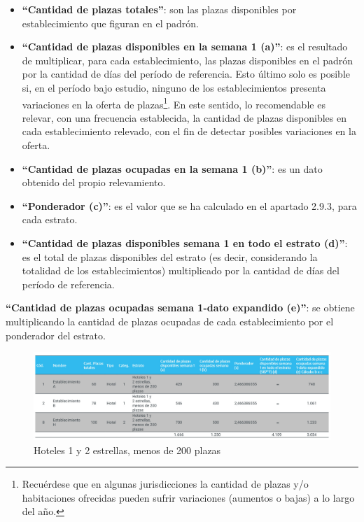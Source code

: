 \documentclass[
]{book}
\begin{document}
\begin{itemize}
\item
  \textbf{``Cantidad de plazas totales''}: son las plazas disponibles por establecimiento que figuran en el padrón.
\item
  \textbf{``Cantidad de plazas disponibles en la semana 1 (a)''}: es el resultado de multiplicar, para cada establecimiento, las plazas disponibles en el padrón por la cantidad de días del período de referencia. Esto último solo es posible si, en el período bajo estudio, ninguno de los establecimientos presenta variaciones en la oferta de plazas\footnote{Recuérdese que en algunas jurisdicciones la cantidad de plazas y/o habitaciones ofrecidas pueden sufrir variaciones (aumentos o bajas) a lo largo del año.}. En este sentido, lo recomendable es relevar, con una frecuencia establecida, la cantidad de plazas disponibles en cada establecimiento relevado, con el fin de detectar posibles variaciones en la oferta.
\item
  \textbf{``Cantidad de plazas ocupadas en la semana 1 (b)''}: es un dato obtenido del propio relevamiento.
\item
  \textbf{``Ponderador (c)''}: es el valor que se ha calculado en el apartado 2.9.3, para cada estrato.
\item
  \textbf{``Cantidad de plazas disponibles semana 1 en todo el estrato (d)''}: es el total de plazas disponibles del estrato (es decir, considerando la totalidad de los establecimientos) multiplicado por la cantidad de días del período de referencia.
\end{itemize}

\textbf{``Cantidad de plazas ocupadas semana 1-dato expandido (e)''}: se obtiene multiplicando la cantidad de plazas ocupadas de cada establecimiento por el ponderador del estrato.

\begin{figure}

{\centering \includegraphics[width=0.8\linewidth]{imagenes/hoteles1y2_estrellas_menos_de_200_plazas} 

}

\caption{Hoteles 1 y 2 estrellas, menos de 200 plazas}\label{fig:1-2-estrellas}
\end{figure}
\end{document}
